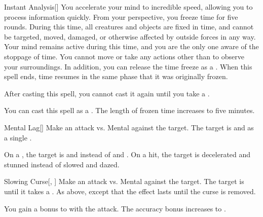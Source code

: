 \lowercase{\hypertarget{spell:Instant Analysis}{}}\label{spell:Instant Analysis}
\begin{freeability}[Rank 3]{\hypertarget{spell:Instant Analysis}{Instant Analysis}}[]
You accelerate your mind to incredible speed, allowing you to process information quickly.
From your perspective, you freeze time for five rounds.
During this time, all creatures and objects are fixed in time, and cannot be targeted, moved, damaged, or otherwise affected by outside forces in any way.
Your mind remains active during this time, and you are the only one aware of the stoppage of time.
You cannot move or take any actions other than to observe your surroundings.
In addition, you can release the time freeze as a .
When this spell ends, time resumes in the same phase that it was originally frozen.

After casting this spell, you cannot cast it again until you take a .

\rankline
{} You can cast this spell as a .
 The length of frozen time increases to five minutes.

\end{freeability}
\vspace{0.25em}



\lowercase{\hypertarget{spell:Mental Lag}{}}\label{spell:Mental Lag}
\begin{freeability}[Rank 3]{\hypertarget{spell:Mental Lag}{Mental Lag}}[]
Make an attack vs. Mental against the target.
\hit The target is  and  as a single .

\rankline
{} On a , the target is  and  instead of  and .
 On a hit, the target is decelerated and stunned instead of slowed and dazed.

\end{freeability}
\vspace{0.25em}



\lowercase{\hypertarget{spell:Slowing Curse}{}}\label{spell:Slowing Curse}
\begin{freeability}[Rank 3]{\hypertarget{spell:Slowing Curse}{Slowing Curse}}[, ]
Make an attack vs. Mental against the target.
\hit The target is  until it takes a .
\crit As above, except that the effect lasts until the curse is removed.

\rankline
{} You gain a  bonus to  with the attack.
 The accuracy bonus increases to .

\end{freeability}
\vspace{0.25em}



